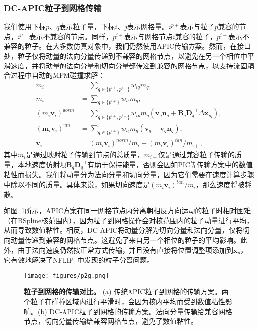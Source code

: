 \subsubsection{DC-APIC粒子到网格传输}
\label{sec:DC-APIC_p2g}
我们使用下标$p$、$q$表示粒子量，下标$i$、$j$表示网格量。$i^{p+}$表示与粒子$p$兼容的节点，$i^{p-}$表示不兼容的节点。同样，$p^{i+}$表示与网格节点$i$兼容的粒子，$p^{i-}$表示不兼容的粒子。在大多数仿真对象中，我们仍然使用APIC传输方案。然而，在接口处，粒子仅将动量的\color{red}法向分量\color{black}传递到不兼容的网格节点，以避免在另一个相位中平滑速度，并将动量的法向分量和切向分量都传递到兼容的网格节点，以支持流固耦合过程中自动的MPM碰撞求解：
\begin{equation}
\begin{aligned}
    m_i &= \sum_{q\in\{p^{i+},p^{i-}\}}w_{iq}m_q, \\
    m_{i+} &= \sum_{q\in\{p^{i+}\}}w_{iq}m_q, \\
    (m_i\mathbf{v}_i)^{norm} &=\sum_{q\in\{p^{i+},p^{i-}\}}w_{ip}m_q(\mathbf{v}_q\mathbf{n}_q + \mathbf{B}_q\mathbf{D}_q^{-1}\Delta\mathbf{x}_{iq}), \\
    (\mathbf{m}_i\mathbf{v}_i)^{tan} &=\sum_{q\in\{p^{i+}\}}w_{iq}m_q(\mathbf{v}_q - \mathbf{v}_q\mathbf{n}_q), \\
    \mathbf{v}_i &=(m_i\mathbf{v}_i)^{norm}/m_i+(m_i\mathbf{v}_i)^{tan}/m_{i+},
\end{aligned}
\end{equation}
其中$m_i$是通过映射粒子传输到节点的总质量，$m_{i+}$仅是通过兼容粒子传输的质量，本地速度仿射项$\mathbf{B}_q\mathbf{D}_q^{-1}$有助于保持能量，否则会因如PIC等传输方案中的数值粘性而损失。我们将动量分为法向分量和切向分量，因为它们需要在速度计算步骤中除以不同的质量。具体来说，如果切向速度是$(m_i\mathbf{v}_i)^{tan}/m_i$，那么速度将被耗散。

如图~\ref{fig:p2g}所示，APIC方案在同一网格节点内分离朝相反方向运动的粒子时相对困难（在BSpline核范围内），因为粒子到网格操作会对核范围内的粒子动量进行平均，从而导致数值粘性。相反，DC-APIC将动量分解为切向分量和法向分量，仅将切向动量传递到兼容的网格节点。这避免了来自另一个相位的粒子的平均影响。此外，由于法向速度仍然按正常方式传输，并且没有直接将位置调整项添加到$\mathbf{x}_p$，它有效地解决了NFLIP~\cite{stomakhin2013material}中发现的粒子分离问题。

\begin{figure}[htbp] \centering \texttt{[image: figures/p2g.png]} \caption{\textbf{粒子到网格的传输对比。} (a) 传统APIC粒子到网格的传输方案。两个粒子在碰撞区域内进行平滑时，会因为核内平均而受到数值粘性影响。(b) DC-APIC粒子到网格的传输方案。法向分量传输给兼容网格节点，切向分量传输给兼容网格节点，避免了数值粘性。} \label{fig:p2g} \end{figure}


